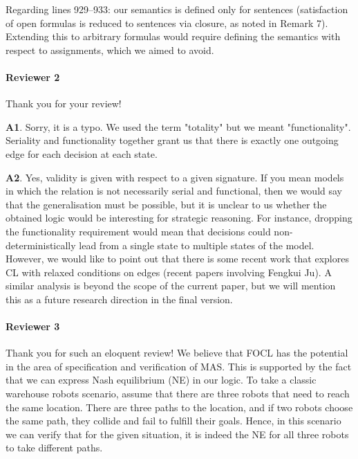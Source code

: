 \documentclass{article}
\begin{document}
Regarding lines 929–933: our semantics is defined only for sentences (satisfaction of open formulas is reduced to sentences via closure, as noted in Remark 7). Extending this to arbitrary formulas would require defining the semantics with respect to assignments, which we aimed to avoid.


\paragraph{Reviewer 2} Thank you for your review!

\textbf{A1}. Sorry, it is a typo. We used the term "totality" but we meant "functionality". Seriality and functionality together grant us that there is exactly one outgoing edge for each decision at each state. 


\textbf{A2}. Yes, validity is given with respect to a given signature. If you mean models in which the relation is not necessarily serial and functional, then we would say that the generalisation must be possible, but it is unclear to us whether the obtained logic would be interesting for strategic reasoning. For instance, dropping the functionality requirement would mean that decisions could non-deterministically lead from a single state to multiple states of the model. However, we would like to point out that there is some recent work that explores CL with relaxed conditions on edges (recent papers involving Fengkui Ju). A similar analysis is beyond the scope of the current paper, but we will mention this as a future research direction in the final version.

\paragraph{Reviewer 3}
Thank you for such an eloquent review! We believe that FOCL has the potential in the area of specification and verification of MAS. This is supported by the fact that we can express Nash equilibrium (NE) in our logic. To take a classic warehouse robots scenario, assume that there are three robots that need to reach the same location. There are three paths to the location, and if two robots choose the same path, they collide and fail to fulfill their goals. Hence, in this scenario we can verify that for the given situation, it is indeed the NE for all three robots to take different paths. 
\end{document}
